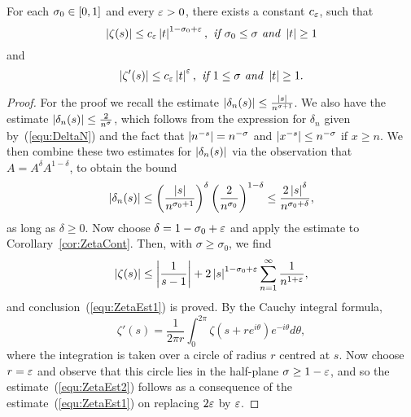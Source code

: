 \begin{proposition}
	For each $\sigma_0 \in \left[0 , 1\right]$ and every $\varepsilon > 0$, there exists a constant $c_\varepsilon$, such that
\begin{equation}\label{equ:ZetaEst1}
	\left|\zeta(s)\right| \leq c_\varepsilon \left|t\right|^{1 - \sigma_0 + \varepsilon}, \textit{ if } \sigma_0 \leq \sigma \textit{ and } \left|t\right| \geq 1
\end{equation}
	and
\begin{equation}\label{equ:ZetaEst2}
	\left|\zeta'(s)\right| \leq c_\varepsilon \left|t\right|^\varepsilon, \textit{ if } 1 \leq \sigma \textit{ and } \left|t\right| \geq 1.
\end{equation}
\end{proposition}
\begin{proof}
	For the proof we recall the estimate $\left|\delta_n(s)\right| \leq \frac{\left|s\right|}{n^{\sigma + 1}}$. We also have the estimate $\left|\delta_n(s)\right| \leq \frac{2}{n^\sigma}$, which follows from the expression for $\delta_n$ given by~(\ref{equ:DeltaN}) and the fact that $\left|n^{-s}\right| = n^{-\sigma}$ and $\left|x^{-s}\right| \leq n^{-\sigma}$ if $x \geq n$. We then combine these two estimates for $\left|\delta_n(s)\right|$ via the observation that $A = A^\delta A^{1 - \delta}$, to obtain the bound
\begin{equation*}
	\left|\delta_n(s)\right| \leq \left(\frac{\left|s\right|}{n^{\sigma_0 + 1}}\right)^\delta \left(\frac{2}{n^{\sigma_0}}\right)^{1 - \delta} \leq \frac{2 \left|s\right|^\delta}{n^{\sigma_0 + \delta}},
\end{equation*}
	as long as $\delta \geq 0$. Now choose $\delta = 1 - \sigma_0 + \varepsilon$ and apply the estimate to Corollary~\ref{cor:ZetaCont}. Then, with $\sigma \geq \sigma_0$, we find
\begin{equation*}
	\left|\zeta(s)\right| \leq \left|\frac{1}{s - 1}\right| + 2 \left|s\right|^{1 - \sigma_0 + \varepsilon} \sum _{n = 1} ^\infty \frac{1}{n^{1 + \varepsilon}},
\end{equation*}
	and conclusion~(\ref{equ:ZetaEst1}) is proved. By the Cauchy integral formula,
\begin{equation*}
	\zeta'(s) = \frac{1}{2 \pi r} \int _0 ^{2 \pi} \zeta(s + re^{i \theta}) e^{-i \theta} d\theta,
\end{equation*}
	where the integration is taken over a circle of radius $r$ centred at $s$. Now choose $r = \varepsilon$ and observe that this circle lies in the half-plane $\sigma \geq 1 - \varepsilon$, and so the estimate~(\ref{equ:ZetaEst2}) follows as a consequence of the estimate~(\ref{equ:ZetaEst1}) on replacing $2 \varepsilon$ by $\varepsilon$.
\end{proof}


